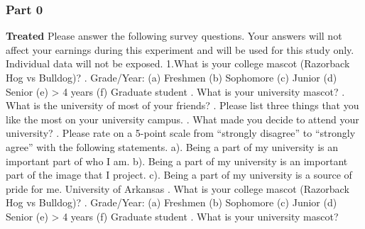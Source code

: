 \subsubsection{Part 0}
\textbf{Treated}
Please answer the following survey questions. Your answers will not affect your earnings during this experiment and will be used for this study only. Individual data will not be exposed.
\newline
1.What is your college mascot (Razorback Hog vs Bulldog)? 
. Grade/Year:
\newline
(a) Freshmen 
\newline
(b) Sophomore
\newline
(c) Junior 
\newline
(d) Senior
\newline
(e) > 4 years
\newline
(f) Graduate student
. What is your university mascot? 
. What is the university of most of your friends?
. Please list three things that you like the most on your university campus.
. What made you decide to attend your university? 
. Please rate on a 5-point scale from “strongly disagree” to “strongly agree” with the following statements.
\newline
a). Being a part of my university is an important part of who I am.
\newline
b). Being a part of my university is an important part of the image that I project. 
\newline
c). Being a part of my university is a source of pride for me. 
\newline
University of Arkansas
. What is your college mascot (Razorback Hog vs Bulldog)? 
. Grade/Year:
\newline
(a) Freshmen 
\newline
(b) Sophomore
\newline
(c) Junior 
\newline
(d) Senior
\newline
(e) > 4 years
\newline
(f) Graduate student
. What is your university mascot?
\newline
